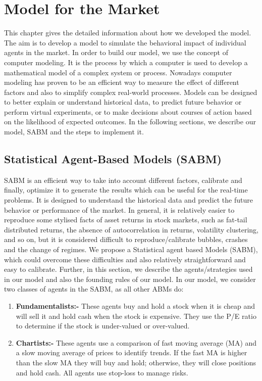 \newpage
\chapter{Model for the Market}

This chapter gives the detailed information about how we developed the model. The aim is to develop a model to simulate the behavioral impact of individual agents in the market. In order to build our model, we use the concept of computer modeling. It is the process by which a computer is used to develop a mathematical model of a complex system or process. Nowadays computer modeling has proven to be an efficient way to measure the effect of different factors and also to simplify complex real-world processes. Models can be designed to better explain or understand historical data, to predict future behavior or perform virtual experiments, or to make decisions about courses of action based on the likelihood of expected outcomes\cite{a8}. In the following sections, we describe our model, SABM and the steps to implement it.


\section{Statistical Agent-Based Models (SABM)}
SABM is an efficient way to take into account different factors, calibrate and finally, optimize it to generate the results which can be useful for the real-time problems. It is designed to understand the historical data and predict the future behavior or performance of the market. In general, it is relatively easier to reproduce some stylised facts of asset returns in stock markets, such as fat-tail distributed returns, the absence of autocorrelation in returns, volatility clustering, and so on, but it is considered difficult to reproduce/calibrate bubbles, crashes and the change of regimes. We propose a Statistical agent based Models (SABM), which could overcome these difficulties and also relatively straightforward and easy to calibrate. Further, in this section, we describe the agents/strategies used in our model and also the founding rules of our model. In our model, we consider two classes of agents in the SABM, as all other ABMs do:
\begin{enumerate}
\item \textbf{Fundamentalists:-} These agents buy and hold a stock when it is cheap and will sell it and hold cash when the stock is expensive. They use the P/E ratio to determine if the stock is under-valued or over-valued.

\item \textbf{Chartists:-} These agents use a comparison of fast moving average (MA) and a slow moving average of prices to identify trends. If the fast MA is higher than the slow MA they will buy and hold; otherwise, they will close positions and hold cash. All agents use stop-loss to manage risks.

\end{enumerate}

